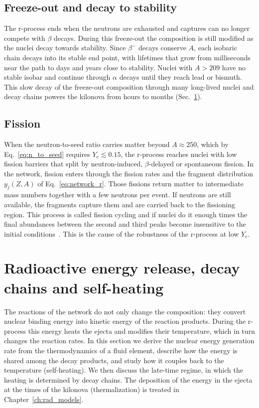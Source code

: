 \subsection{Freeze-out and decay to stability}\label{sec:rfreeze}
 
The r-process ends when the neutrons are exhausted and captures can no longer compete with $\beta$ decays.
During this freeze-out the composition is still modified as the nuclei decay towards stability.
Since $\beta^-$ decays conserve $A$, each isobaric chain decays into its stable end point, with lifetimes that grow from milliseconds near the path to days and years close to stability.
Nuclei with $A>209$ have no stable isobar and continue through $\alpha$ decays until they reach lead or bismuth.
This slow decay of the freeze-out composition through many long-lived nuclei and decay chains powers the kilonova from hours to months (Sec.~\ref{sec:energy}).
 
\subsection{Fission}\label{sec:fission}
 
When the neutron-to-seed ratio carries matter beyond $A\approx250$, which by Eq.~\ref{eq:n_to_seed} requires $Y_e\lesssim0.15$, the r-process reaches nuclei with low fission barriers that split by neutron-induced, $\beta$-delayed or spontaneous fission.
In the network, fission enters through the fission rates and the fragment distribution $y_j(Z,A)$ of Eq.~\ref{eq:network_r}.
Those fissions return matter to intermediate mass numbers together with a few neutrons per event.
If neutrons are still available, the fragments capture them and are carried back to the fissioning region.
This process is called fission cycling and if nuclei do it enough times the final abundances between the second and third peaks become insensitive to the initial conditions~\cite{korobkin_astrophysical_2012}.
This is the cause of the robustness of the r-process at low $Y_e$.

\section{Radioactive energy release, decay chains and self-heating}\label{sec:energy}

The reactions of the network do not only change the composition: they convert nuclear binding energy into kinetic energy of the reaction products.
During the r-process this energy heats the ejecta and modifies their temperature, which in turn changes the reaction rates.
In this section we derive the nuclear energy generation rate from the thermodynamics of a fluid element, describe how the energy is shared among the decay products, and study how it couples back to the temperature (self-heating).
We then discuss the late-time regime, in which the heating is determined by decay chains.
The deposition of the energy in the ejecta at the times of the kilonova (thermalization) is treated in Chapter~\ref{ch:rad_models}.

